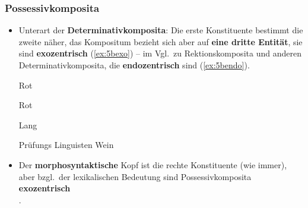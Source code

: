

\begin{frame}
\frametitle{Possessivkomposita}

\begin{itemize}
	\item Unterart der \textbf{Determinativkomposita}: Die erste Konstituente bestimmt die zweite näher, das Kompositum bezieht sich aber auf \textbf{eine dritte Entität}, sie sind \textbf{exozentrisch} (\ref{ex:5bexo}) -- im Vgl.\ zu Rektionskomposita und anderen Determinativkomposita, die \textbf{endozentrisch} sind (\ref{ex:5bendo}).
	
	\settowidth{} 
	\ea\label{ex:5bexo}
		\ea Rot 

	
		\ex Rot 
	
		\ex Lang 
		\z

	
	\ex \label{ex:5bendo}
		\ea Prüfungs 
		\ex Linguisten 
		\ex Wein 
		\z 
	\z 

\pause 

	\item Der \textbf{morphosyntaktische} Kopf ist die rechte Konstituente (wie immer), aber bzgl.\ der lexikalischen Bedeutung sind Possessivkomposita \textbf{exozentrisch}\\
	\citep[vgl.][]{Fries&MyP16j}.
	
\end{itemize}

\end{frame}



